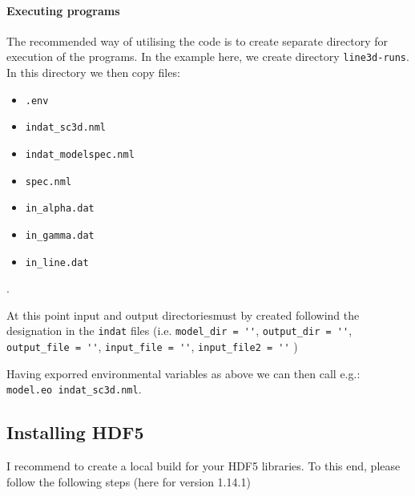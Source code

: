 \documentclass[10pt,a4paper]{article}
\begin{document}
\paragraph{Executing programs}
The recommended way of utilising the code is to create separate directory for execution of the programs. 
In the example here, we create directory \texttt{line3d-runs}. 
In this directory we then copy files:
\begin{itemize}
  \item \texttt{.env}
  \item \texttt{indat\_sc3d.nml}
  \item \texttt{indat\_modelspec.nml}
  \item \texttt{spec.nml}
  \item \texttt{in\_alpha.dat}
  \item \texttt{in\_gamma.dat}
  \item \texttt{in\_line.dat}
\end{itemize}. 

At this point input and output directoriesmust by created followind the designation in the \texttt{indat} files 
(i.e. \verb|model_dir = ''|, \verb|output_dir = ''|, \verb|output_file = ''|, \verb|input_file = ''|, \verb|input_file2 = ''| )

Having exporred environmental variables as above we can then call e.g.:\\ 
\verb|model.eo indat_sc3d.nml|. 

\subsection{Installing HDF5}
\label{subsec:hdf5}

I recommend to create a local build for your HDF5 libraries. 
To this end, please follow the following steps (here for version 1.14.1)
\end{document}
